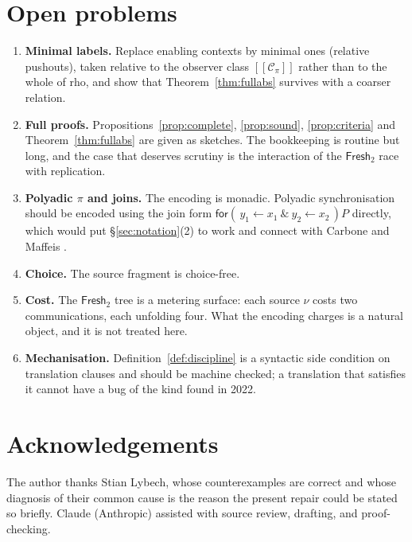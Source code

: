 \documentclass[11pt]{article}
\theoremstyle{definition}
\theoremstyle{plain}
\theoremstyle{remark}
\newcommand{\inpp}[5]{\mathsf{for}(\,#1 \leftarrow #2\ \&\ #3 \leftarrow #4\,)#5}
\newcommand{\enc}[1]{[\![#1]\!]}
\newcommand{\Frsh}{\mathsf{Fresh}_2}
\newcommand{\Ctx}{\mathscr{C}}
\begin{document}
\section{Open problems}\label{sec:open}

\begin{enumerate}[label=\arabic*.,leftmargin=2.2em]
\item \textbf{Minimal labels.} Replace enabling contexts by minimal
ones (relative pushouts), taken relative to the observer class
$\enc{\Ctx_\pi}$ rather than to the whole of rho, and show that
Theorem~\ref{thm:fullabs} survives with a coarser relation.
\item \textbf{Full proofs.} Propositions~\ref{prop:complete},
\ref{prop:sound}, \ref{prop:criteria} and Theorem~\ref{thm:fullabs} are
given as sketches. The bookkeeping is routine but long, and the case
that deserves scrutiny is the interaction of the $\Frsh$ race with
replication.
\item \textbf{Polyadic $\pi$ and joins.} The encoding is monadic. Polyadic
synchronisation should be encoded using the join form
$\inpp{y_1}{x_1}{y_2}{x_2}{P}$ directly, which would put
\S\ref{sec:notation}(2) to work and connect with Carbone and Maffeis
\cite{CarboneMaffeis03}.
\item \textbf{Choice.} The source fragment is choice-free.
\item \textbf{Cost.} The $\Frsh$ tree is a metering surface: each source
$\nu$ costs two communications, each unfolding four. What the encoding
charges is a natural object, and it is not treated here.
\item \textbf{Mechanisation.} Definition~\ref{def:discipline} is a
syntactic side condition on translation clauses and should be machine
checked; a translation that satisfies it cannot have a bug of the kind
found in 2022.
\end{enumerate}

\section*{Acknowledgements}

The author thanks Stian Lybech, whose counterexamples are correct and
whose diagnosis of their common cause is the reason the present repair
could be stated so briefly. Claude (Anthropic) assisted with source
review, drafting, and proof-checking.
\end{document}

